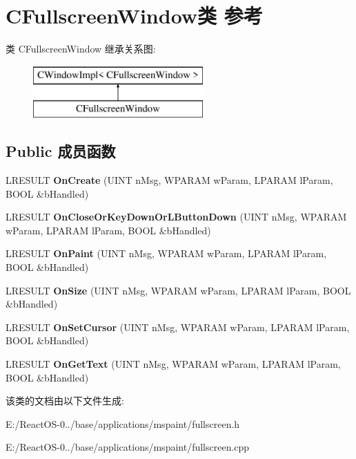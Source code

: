 \hypertarget{class_c_fullscreen_window}{}\section{C\+Fullscreen\+Window类 参考}
\label{class_c_fullscreen_window}
类 C\+Fullscreen\+Window 继承关系图\+:\begin{figure}[H]
\begin{center}
\leavevmode
\includegraphics[height=2.000000cm]{class_c_fullscreen_window}
\end{center}
\end{figure}
\subsection*{Public 成员函数}
\begin{DoxyCompactItemize}
\item 
\mbox{\label{class_c_fullscreen_window_a8cc0ba3340d6dea64939d1109eef040a}} 
L\+R\+E\+S\+U\+LT {\bfseries On\+Create} (U\+I\+NT n\+Msg, W\+P\+A\+R\+AM w\+Param, L\+P\+A\+R\+AM l\+Param, B\+O\+OL \&b\+Handled)
\item 
\mbox{\label{class_c_fullscreen_window_ace976ca42b5816c614050e0937388c3c}} 
L\+R\+E\+S\+U\+LT {\bfseries On\+Close\+Or\+Key\+Down\+Or\+L\+Button\+Down} (U\+I\+NT n\+Msg, W\+P\+A\+R\+AM w\+Param, L\+P\+A\+R\+AM l\+Param, B\+O\+OL \&b\+Handled)
\item 
\mbox{\label{class_c_fullscreen_window_a5374591d71a10d775945dd5c6daffa40}} 
L\+R\+E\+S\+U\+LT {\bfseries On\+Paint} (U\+I\+NT n\+Msg, W\+P\+A\+R\+AM w\+Param, L\+P\+A\+R\+AM l\+Param, B\+O\+OL \&b\+Handled)
\item 
\mbox{\label{class_c_fullscreen_window_af80e48e4071d023362dacd51a89c01a9}} 
L\+R\+E\+S\+U\+LT {\bfseries On\+Size} (U\+I\+NT n\+Msg, W\+P\+A\+R\+AM w\+Param, L\+P\+A\+R\+AM l\+Param, B\+O\+OL \&b\+Handled)
\item 
\mbox{\label{class_c_fullscreen_window_aec63309723f58330add98db9a0743b4b}} 
L\+R\+E\+S\+U\+LT {\bfseries On\+Set\+Cursor} (U\+I\+NT n\+Msg, W\+P\+A\+R\+AM w\+Param, L\+P\+A\+R\+AM l\+Param, B\+O\+OL \&b\+Handled)
\item 
\mbox{\label{class_c_fullscreen_window_a8fada71d4fc3e0efd1a118410b4e44f1}} 
L\+R\+E\+S\+U\+LT {\bfseries On\+Get\+Text} (U\+I\+NT n\+Msg, W\+P\+A\+R\+AM w\+Param, L\+P\+A\+R\+AM l\+Param, B\+O\+OL \&b\+Handled)
\end{DoxyCompactItemize}


该类的文档由以下文件生成\+:\begin{DoxyCompactItemize}
\item 
E\+:/\+React\+O\+S-\/0../base/applications/mspaint/fullscreen.\+h\item 
E\+:/\+React\+O\+S-\/0../base/applications/mspaint/fullscreen.\+cpp\end{DoxyCompactItemize}
